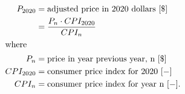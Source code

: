 \begin{align}
        P_{2020} &= \mbox{adjusted price in 2020 dollars }[\$]\\
                &= \frac{P_{n} \cdot CPI_{2020}}{CPI_{n}}\\
        \intertext{where}
        P_n &= \mbox{price in year previous year, n } [\$]\\
        CPI_{2020} &= \mbox{consumer price index for 2020 } [-]\\
        CPI_n &= \mbox{consumer price index for year n } [-].
\end{align}


